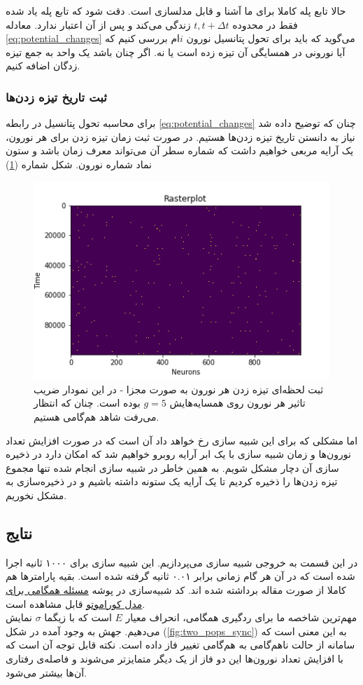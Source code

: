 \documentclass[12pt,onecolumn,a4paper]{article}
\begin{document}
حالا تابع پله کاملا برای ما آشنا و قابل مدلسازی است. دقت شود که تابع پله یاد شده فقط در محدوده $t, t+\Delta t$ زندگی می‌کند و پس از آن اعتبار ندارد. معادله \ref{eq:potential_changes}  می‌گوید که باید برای تحول پتانسیل نورون $i$ام بررسی کنیم که آیا نورونی در همسایگی آن تیزه زده است یا نه. اگر چنان باشد یک واحد به جمع تیزه زدگان اضافه کنیم.


\subsubsection{ثبت تاریخ تیزه زدن‌ها}
برای محاسبه تحول پتانسیل در رابطه \ref{eq:potential_changes} چنان که توضیح داده شد نیاز به دانستن تاریخ تیزه زدن‌ها هستیم. در صورت ثبت زمان تیزه زدن برای هر نورون، یک آرایه مربعی خواهیم داشت که شماره سطر آن می‌تواند معرف زمان باشد و ستون نماد شماره نورون. شکل شماره (\ref{fig:rasterplot})
\begin{figure}
\centering
  \includegraphics[width = 10 cm]{../scripts/kuramoto_model_synchoronization_problem/raster_plot_N1000.png}
 \caption{ثبت لحظه‌ای تیزه زدن هر نورون به صورت مجزا - در این نمودار ضریب تاثیر هر نورون روی همسایه‌هایش $g = 5$ بوده است. چنان که انتظار می‌رفت شاهد هم‌گامی هستیم.}
  \label{fig:rasterplot}
\end{figure}
اما مشکلی که برای این شبیه سازی رخ خواهد داد آن است که در صورت افزایش تعداد نورون‌ها و زمان شبیه سازی با یک ابر آرایه روبرو خواهیم شد که امکان دارد در ذخیره سازی آن دچار مشکل شویم. به همین خاطر در شبیه سازی انجام شده تنها مجموع تیزه زدن‌ها را ذخیره کردیم تا یک آرایه یک ستونه داشته باشیم و در ذخیره‌سازی به مشکل نخوریم.

\subsection{نتایج}
در این قسمت به خروجی شبیه سازی می‌پردازیم. این شبیه سازی برای ۱۰۰۰ ثانیه اجرا شده است که در آن هر گام زمانی برابر ۰.۰۱ ثانیه گرفته شده است. بقیه پارامترها هم کاملا از صورت مقاله برداشته شده اند. کد شبیه‌سازی در پوشه 
\href{run://..//scripts//kuramoto_model_synchoronization_problem}{مسئله همگامی برای مدل کوراموتو}
قابل مشاهده است.\\
مهم‌ترین شاخصه ما برای ردگیری همگامی، انحراف معیار $E$ است که با زیگما $\sigma$ نمایش می‌دهیم. جهش به وجود آمده در شکل‌ (\ref{fig:two_pops_sync}) به این معنی است که سامانه از حالت ناهم‌گامی به هم‌گامی تغییر فاز داده است. نکته قابل توجه آن است که با افزایش تعداد نورون‌ها این دو فاز از یک دیگر متمایزتر می‌شوند و فاصله‌ی رفتاری آن‌ها بیشتر می‌شود.
\end{document}
